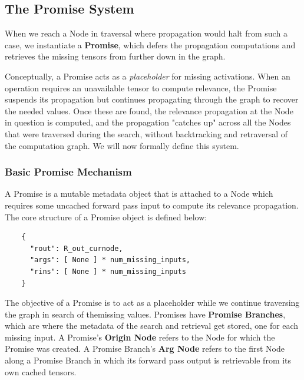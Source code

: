 \documentclass{article}
\begin{document}
\subsection{The Promise System}
\label{sec:promise-system}
When we reach a Node in traversal where propagation would halt from such a case, we instantiate a \textbf{Promise},
which defers the propagation computations and retrieves the missing tensors from further down in the graph.

Conceptually, a Promise acts as a \textit{placeholder} for missing activations. When an operation requires an unavailable
tensor to compute relevance, the Promise suspends its propagation but continues propagating through the graph to recover
the needed values. Once these are found, the relevance propagation at the Node in question is computed, and the
propagation "catches up" across all the Nodes that were traversed during the search, without backtracking and retraversal
of the computation graph.
We will now formally define this system.\\

\subsubsection{Basic Promise Mechanism}
\begin{definition}[Promise]
  A Promise is a mutable metadata object that is attached to a Node which requires some uncached forward pass input to compute its relevance propagation.
  The core structure of a Promise object is defined below:
  \begin{verbatim}
    {
      "rout": R_out_curnode,
      "args": [ None ] * num_missing_inputs,
      "rins": [ None ] * num_missing_inputs
    }
  \end{verbatim}
\end{definition}

The objective of a Promise is to act as a placeholder while we continue traversing the graph in search of themissing values.
Promises have \textbf{Promise Branches}, which are where the metadata of the search and retrieval get stored, one for each missing input.
A Promise's \textbf{Origin Node} refers to the Node for which the Promise was created.
A Promise Branch's \textbf{Arg Node} refers to the first Node along a Promise Branch in which its forward pass output is retrievable from its own cached tensors.
\end{document}
